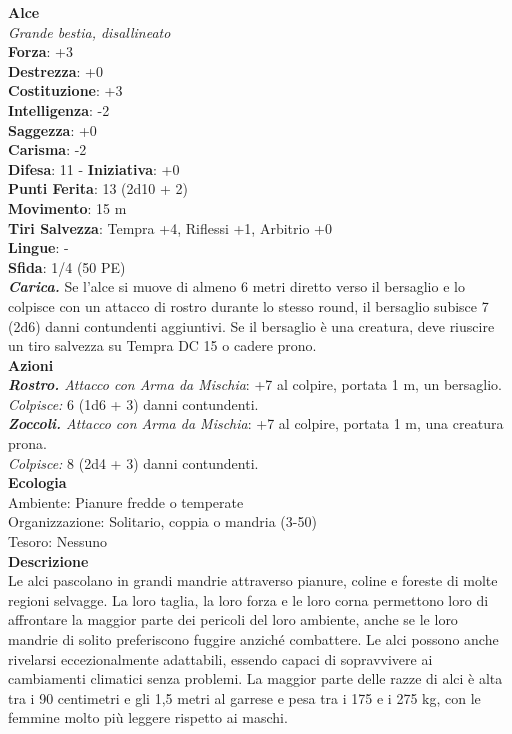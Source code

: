 \begin{multicols}{2}
\medskip\textbf{Alce}\\
\emph{Grande bestia, disallineato}\\
\textbf{Forza}: +3\\
\textbf{Destrezza}: +0\\
\textbf{Costituzione}: +3\\
\textbf{Intelligenza}: -2\\
\textbf{Saggezza}: +0\\
\textbf{Carisma}: -2\\
\textbf{Difesa}: 11 - \textbf{Iniziativa}: +0\\
\textbf{Punti Ferita}: 13 (2d10 + 2)\\
\textbf{Movimento}: 15 m\\
\textbf{Tiri Salvezza}:  Tempra +4, Riflessi +1, Arbitrio +0\\
\textbf{Lingue}: -\\
\textbf{Sfida}: 1/4 (50 PE)\smallskip\\
\emph{\textbf{Carica.}} Se l'alce si muove di almeno 6 metri diretto verso il bersaglio e lo colpisce con un attacco di rostro durante lo stesso round, il bersaglio subisce 7 (2d6) danni contundenti aggiuntivi. Se il bersaglio è una creatura, deve riuscire un tiro salvezza su Tempra DC  15 o cadere prono.\\
\smallskip\textbf{Azioni}\\
\emph{\textbf{Rostro.} Attacco con Arma da Mischia}: +7 al colpire, portata 1 m, un bersaglio.\\
\emph{Colpisce:} 6 (1d6 + 3) danni contundenti.\\
\emph{\textbf{Zoccoli.} Attacco con Arma da Mischia}: +7 al colpire, portata 1 m, una creatura prona.\\
\emph{Colpisce:} 8 (2d4 + 3) danni contundenti.\\
\textbf{Ecologia}\\
Ambiente: Pianure fredde o temperate\\
Organizzazione: Solitario, coppia o mandria (3-50)\\
Tesoro: Nessuno\\
\textbf{Descrizione}\\
Le alci pascolano in grandi mandrie attraverso pianure, coline e foreste di molte regioni selvagge. La loro taglia, la loro forza e le loro corna permettono loro di affrontare la maggior parte dei pericoli del loro ambiente, anche se le loro mandrie di solito preferiscono fuggire anziché combattere. Le alci possono anche rivelarsi eccezionalmente adattabili, essendo capaci di sopravvivere ai cambiamenti climatici senza problemi. La maggior parte delle razze di alci è alta tra i 90 centimetri e gli 1,5 metri al garrese e pesa tra i 175 e i 275 kg, con le femmine molto più leggere rispetto ai maschi.\\


\end{multicols}
